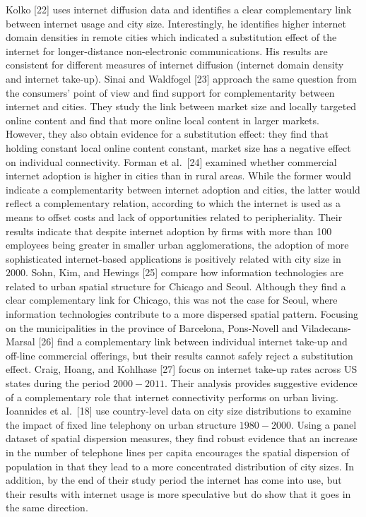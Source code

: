 \documentclass[10pt,letterpaper]{article}
\begin{document}
Kolko {[}22{]} uses internet diffusion data and identifies a clear
complementary link between internet usage and city size. Interestingly,
he identifies higher internet domain densities in remote cities which
indicated a substitution effect of the internet for longer-distance
non-electronic communications. His results are consistent for different
measures of internet diffusion (internet domain density and internet
take-up). Sinai and Waldfogel {[}23{]} approach the same question from
the consumers' point of view and find support for complementarity
between internet and cities. They study the link between market size and
locally targeted online content and find that more online local content
in larger markets. However, they also obtain evidence for a substitution
effect: they find that holding constant local online content constant,
market size has a negative effect on individual connectivity. Forman et
al.~{[}24{]} examined whether commercial internet adoption is higher in
cities than in rural areas. While the former would indicate a
complementarity between internet adoption and cities, the latter would
reflect a complementary relation, according to which the internet is
used as a means to offset costs and lack of opportunities related to
peripheriality. Their results indicate that despite internet adoption by
firms with more than 100 employees being greater in smaller urban
agglomerations, the adoption of more sophisticated internet-based
applications is positively related with city size in \(2000\). Sohn,
Kim, and Hewings {[}25{]} compare how information technologies are
related to urban spatial structure for Chicago and Seoul. Although they
find a clear complementary link for Chicago, this was not the case for
Seoul, where information technologies contribute to a more dispersed
spatial pattern. Focusing on the municipalities in the province of
Barcelona, Pons-Novell and Viladecans-Marsal {[}26{]} find a
complementary link between individual internet take-up and off-line
commercial offerings, but their results cannot safely reject a
substitution effect. Craig, Hoang, and Kohlhase {[}27{]} focus on
internet take-up rates across US states during the period \(2000-2011\).
Their analysis provides suggestive evidence of a complementary role that
internet connectivity performs on urban living. Ioannides et
al.~{[}18{]} use country-level data on city size distributions to
examine the impact of fixed line telephony on urban structure
\(1980-2000\). Using a panel dataset of spatial dispersion measures,
they find robust evidence that an increase in the number of telephone
lines per capita encourages the spatial dispersion of population in that
they lead to a more concentrated distribution of city sizes. In
addition, by the end of their study period the internet has come into
use, but their results with internet usage is more speculative but do
show that it goes in the same direction.
\end{document}
